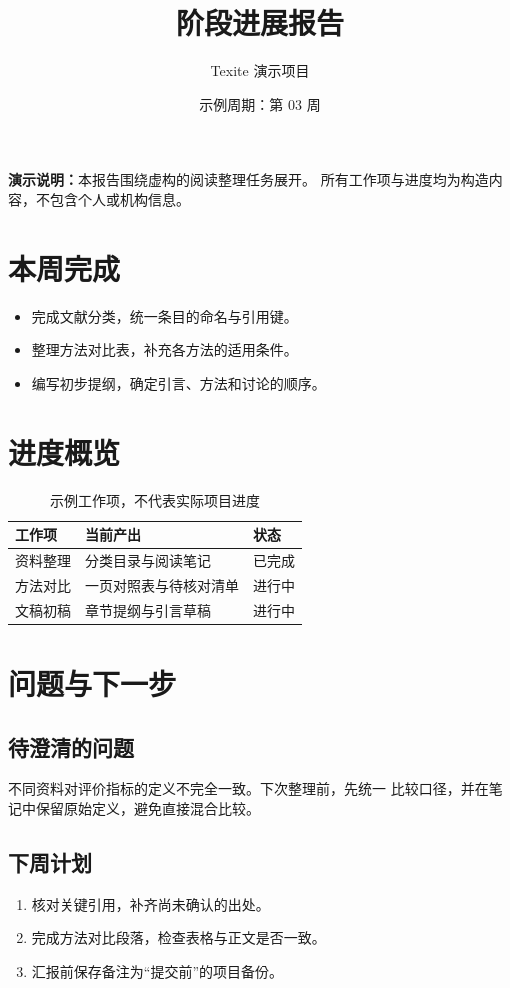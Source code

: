 \documentclass[UTF8,a4paper,11pt]{ctexart}
\title{阶段进展报告}
\author{Texite 演示项目}
\date{示例周期：第 03 周}
\begin{document}
\maketitle
\noindent\textbf{演示说明：}本报告围绕虚构的阅读整理任务展开。
所有工作项与进度均为构造内容，不包含个人或机构信息。
\section{本周完成}
\begin{itemize}[itemsep=4pt]
\item 完成文献分类，统一条目的命名与引用键。
\item 整理方法对比表，补充各方法的适用条件。
\item 编写初步提纲，确定引言、方法和讨论的顺序。
\end{itemize}
\section{进度概览}
\begin{table}[htbp]
\centering
\begin{tabularx}{\linewidth}{lXl}
\toprule
工作项 & 当前产出 & 状态 \\
\midrule
资料整理 & 分类目录与阅读笔记 & 已完成 \\
方法对比 & 一页对照表与待核对清单 & 进行中 \\
文稿初稿 & 章节提纲与引言草稿 & 进行中 \\
\bottomrule
\end{tabularx}
\caption{示例工作项，不代表实际项目进度}
\end{table}
\section{问题与下一步}
\subsection{待澄清的问题}
不同资料对评价指标的定义不完全一致。下次整理前，先统一
比较口径，并在笔记中保留原始定义，避免直接混合比较。
\subsection{下周计划}
\begin{enumerate}[itemsep=4pt]
\item 核对关键引用，补齐尚未确认的出处。
\item 完成方法对比段落，检查表格与正文是否一致。
\item 汇报前保存备注为“提交前”的项目备份。
\end{enumerate}
\end{document}

